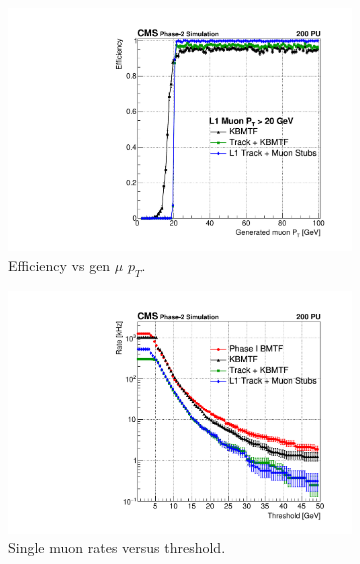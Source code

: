 \begin{figure} [htb!]
	\centering
	\captionsetup{justification=centering}
	\begin{subfigure}[h]{0.45\linewidth}
		\centering
		\includegraphics[width=\linewidth]{figs/04_muons/effVsPt_20_TPS.pdf}
		\caption{Efficiency vs gen $\mu$ $p_T$.}
		\label{}
	\end{subfigure} \hspace{0.05\linewidth}
	\begin{subfigure}[h]{0.45\linewidth}
		\centering
		\includegraphics[width=\linewidth]{figs/04_muons/rateVsPt_TPS.pdf}
		\caption{Single muon rates versus threshold.}
		\label{}
	\end{subfigure}
	\begin{subfigure}[h]{0.45\linewidth}
		\centering

\end{subfigure}
\end{figure}
